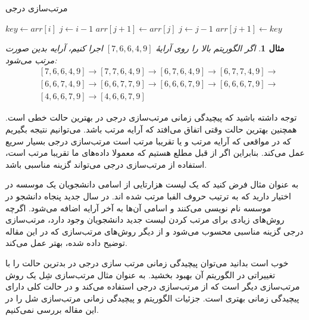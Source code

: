 \documentclass[12pt]{article}
\newtheorem{example}{مثال}
\begin{document}
\begin{algorithm}[H]
  \caption{مرتب‌سازی درجی}
  \label{alg:a1}
  \begin{latin}
    \begin{algorithmic}[1]
      \State $key \gets arr[i]$
      \State $j \gets i-1$
      \State $arr[j+1] \gets arr[j]$
      \State $j \gets j - 1$
      \EndWhile
      \State $arr[j+1] \gets key$
      \EndFor
      \EndProcedure
    \end{algorithmic}
  \end{latin}
\end{algorithm}

\begin{example}
  اگر الگوریتم بالا را روی آرایهٔ
  $[7, 6, 6, 4, 9]$
  اجرا کنیم،
  آرایه بدین صورت مرتب می‌شود:
  \begin{align*}
     & [7, 6, 6, 4, 9] \rightarrow [7, 7, 6, 4, 9] \rightarrow
    [6, 7, 6, 4, 9] \rightarrow [6, 7, 7, 4, 9] \rightarrow    \\
     & [6, 6, 7, 4, 9] \rightarrow [6, 6, 7, 7, 9] \rightarrow
    [6, 6, 6, 7, 9] \rightarrow [6, 6, 6, 7, 9]  \rightarrow   \\
     & [4, 6, 6, 7, 9] \rightarrow [4, 6, 6, 7, 9]
  \end{align*}
\end{example}

توجه داشته باشید که پیچیدگی زمانی مرتب‌سازی درجی در بهترین حالت خطی است.
همچنین بهترین حالت وقتی اتفاق می‌افتد که آرایه مرتب باشد.
می‌توانیم نتیجه بگیریم که در مواقعی که آرایه مرتب و یا تقریبا مرتب است
مرتب‌سازی درجی بسیار سریع عمل می‌کند.
بنابراین اگر از قبل مطلع هستیم که معمولا داده‌های ما تقریبا مرتب است، استفاده از مرتب‌سازی درجی
می‌تواند گزینه مناسبی باشد.

به عنوان مثال فرض کنید که یک لیست هزارتایی از اسامی دانشجویان یک موسسه در اختیار دارید که به ترتیب حروف الفبا مرتب شده اند.
در سال جدید پنجاه دانشجو در موسسه نام نویسی می‌کنند و اسامی آن‌ها به آخر آرایه اضافه می‌شود.
اگرچه روش‌های زیادی برای مرتب کردن لیست جدید دانشجویان وجود دارد، مرتب‌سازی درجی گزینه مناسبی محسوب می‌شود
و از دیگر روش‌های مرتب‌سازی که در این مقاله توضیح داده شده، بهتر عمل می‌کند.

خوب است بدانید
می‌توان پیچیدگی زمانی مرتب سازی درجی در بدترین حالت را با تغییراتی در الگوریتم آن بهبود بخشید.
به عنوان مثال مرتب‌سازی شِل
یک روش مرتب‌سازی دیگر است که از مرتب‌سازی درجی استفاده می‌کند
و در حالت کلی دارای پیچیدگی زمانی بهتری است.
\cite{shell1}
\cite{shell2}
جزئیات الگوریتم و پیچیدگی زمانی مرتب‌سازی شل را در این مقاله بررسی نمی‌کنیم.
\end{document}
